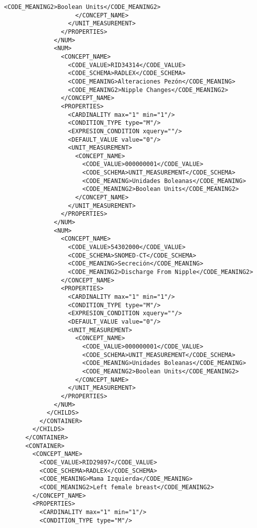 \begin{lstlisting}[label=some-code,caption=Some Code]
                      <CODE_MEANING2>Boolean Units</CODE_MEANING2>
                    </CONCEPT_NAME>
                  </UNIT_MEASUREMENT>
                </PROPERTIES>
              </NUM>
              <NUM>
                <CONCEPT_NAME>
                  <CODE_VALUE>RID34314</CODE_VALUE>
                  <CODE_SCHEMA>RADLEX</CODE_SCHEMA>
                  <CODE_MEANING>Alteraciones Pezón</CODE_MEANING>
                  <CODE_MEANING2>Nipple Changes</CODE_MEANING2>
                </CONCEPT_NAME>
                <PROPERTIES>
                  <CARDINALITY max="1" min="1"/>
                  <CONDITION_TYPE type="M"/>
                  <EXPRESION_CONDITION xquery=""/>
                  <DEFAULT_VALUE value="0"/>
                  <UNIT_MEASUREMENT>
                    <CONCEPT_NAME>
                      <CODE_VALUE>000000001</CODE_VALUE>
                      <CODE_SCHEMA>UNIT_MEASUREMENT</CODE_SCHEMA>
                      <CODE_MEANING>Unidades Boleanas</CODE_MEANING>
                      <CODE_MEANING2>Boolean Units</CODE_MEANING2>
                    </CONCEPT_NAME>
                  </UNIT_MEASUREMENT>
                </PROPERTIES>
              </NUM>
              <NUM>
                <CONCEPT_NAME>
                  <CODE_VALUE>54302000</CODE_VALUE>
                  <CODE_SCHEMA>SNOMED-CT</CODE_SCHEMA>
                  <CODE_MEANING>Secreción</CODE_MEANING>
                  <CODE_MEANING2>Discharge From Nipple</CODE_MEANING2>
                </CONCEPT_NAME>
                <PROPERTIES>
                  <CARDINALITY max="1" min="1"/>
                  <CONDITION_TYPE type="M"/>
                  <EXPRESION_CONDITION xquery=""/>
                  <DEFAULT_VALUE value="0"/>
                  <UNIT_MEASUREMENT>
                    <CONCEPT_NAME>
                      <CODE_VALUE>000000001</CODE_VALUE>
                      <CODE_SCHEMA>UNIT_MEASUREMENT</CODE_SCHEMA>
                      <CODE_MEANING>Unidades Boleanas</CODE_MEANING>
                      <CODE_MEANING2>Boolean Units</CODE_MEANING2>
                    </CONCEPT_NAME>
                  </UNIT_MEASUREMENT>
                </PROPERTIES>
              </NUM>
            </CHILDS>
          </CONTAINER>
        </CHILDS>
      </CONTAINER>
      <CONTAINER>
        <CONCEPT_NAME>
          <CODE_VALUE>RID29897</CODE_VALUE>
          <CODE_SCHEMA>RADLEX</CODE_SCHEMA>
          <CODE_MEANING>Mama Izquierda</CODE_MEANING>
          <CODE_MEANING2>Left female breast</CODE_MEANING2>
        </CONCEPT_NAME>
        <PROPERTIES>
          <CARDINALITY max="1" min="1"/>
          <CONDITION_TYPE type="M"/>

\end{lstlisting}
